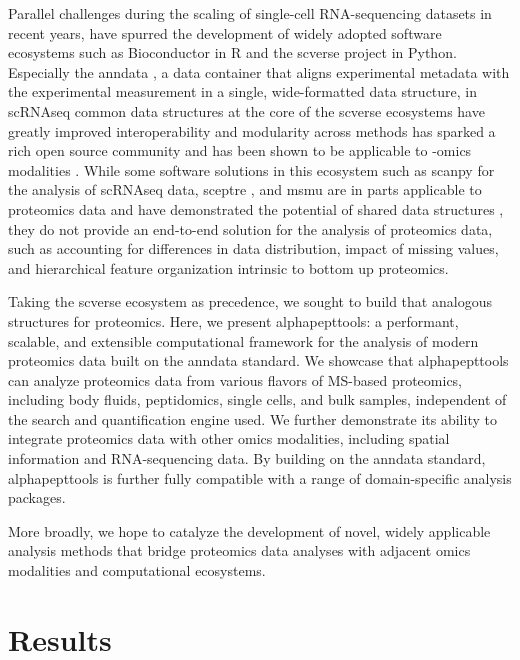 \documentclass[pdflatex,sn-nature]{sn-jnl}%
\theoremstyle{thmstyleone}%
\theoremstyle{thmstyletwo}%
\theoremstyle{thmstylethree}%
\begin{document}
Parallel challenges during the scaling of single-cell RNA-sequencing datasets in recent years, have spurred the development of widely adopted software ecosystems such as Bioconductor \cite{Amezquita.2020} in R and the scverse project \cite{Virshup.2023} in Python.
Especially the anndata \cite{Virshup.2021}, a data container that aligns experimental metadata with the experimental measurement in a single, wide-formatted data structure, in scRNAseq common data structures at the core of the scverse \cite{Virshup.2023} ecosystems have greatly improved interoperability and modularity across methods has sparked a rich open source community and has been shown to be applicable to -omics modalities \cite{Bredikhin.2022,Marconato.2024,Heumos.2024}.
While some software solutions in this ecosystem such as scanpy \cite{Wolf.2018} for the analysis of scRNAseq data, sceptre \cite{Schoof.2021}, and msmu \cite{Choi.2026} are in parts applicable to proteomics data and have demonstrated the potential of shared data structures \cite{Furtwangler.2025}, they do not provide an end-to-end solution for the analysis of proteomics data, such as accounting for differences in data distribution, impact of missing values, and hierarchical feature organization intrinsic to bottom up proteomics. \smallskip

Taking the scverse ecosystem as precedence, we sought to build that analogous structures for proteomics.
Here, we present alphapepttools: a performant, scalable, and extensible computational framework for the analysis of modern proteomics data built on the anndata standard.
We showcase that alphapepttools can analyze proteomics data from various flavors of MS-based proteomics, including body fluids, peptidomics, single cells, and bulk samples, independent of the search and quantification engine used.
We further demonstrate its ability to integrate proteomics data with other omics modalities, including spatial information and RNA-sequencing data.
By building on the anndata standard, alphapepttools is further fully compatible with a range of domain-specific analysis packages.

More broadly, we hope to catalyze the development of novel, widely applicable analysis methods that bridge proteomics data analyses with adjacent omics modalities and computational ecosystems.

\section{Results}\label{sec:results}
\end{document}
